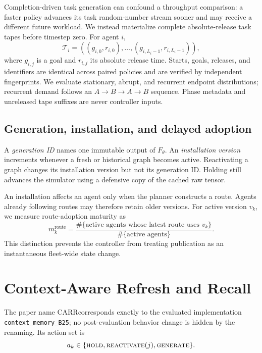 \documentclass[sigconf,anonymous,review]{acmart}
\newcommand{\carr}{\textsc{CARR}}
\begin{document}
Completion-driven task generation can confound a throughput comparison: a
faster policy advances its task random-number stream sooner and may receive a
different future workload. We instead materialize complete absolute-release
task tapes before timestep zero. For agent $i$,
\begin{equation}
  \mathcal{T}_i=((g_{i,0},r_{i,0}),\ldots,(g_{i,L_i-1},r_{i,L_i-1})),
\end{equation}
where $g_{i,j}$ is a goal and $r_{i,j}$ its absolute release time. Starts,
goals, releases, and identifiers are identical across paired policies and are
verified by independent fingerprints. We evaluate stationary, abrupt, and
recurrent endpoint distributions; recurrent demand follows an
$A\!\rightarrow\!B\!\rightarrow\!A\!\rightarrow\!B$ sequence. Phase metadata
and unreleased tape suffixes are never controller inputs.

\subsection{Generation, installation, and delayed adoption}

A \emph{generation ID} names one immutable output of $F_\theta$. An
\emph{installation version} increments whenever a fresh or historical graph
becomes active. Reactivating a graph changes its installation version but not
its generation ID. Holding still advances the simulator using a defensive copy
of the cached raw tensor.

An installation affects an agent only when the planner constructs a route.
Agents already following routes may therefore retain older versions. For
active version $v_k$, we measure route-adoption maturity as
\begin{equation}
 m_k^{\mathrm{route}}=
 \frac{\#\{\text{active agents whose latest route uses }v_k\}}
      {\#\{\text{active agents}\}}.
\end{equation}
This distinction prevents the controller from treating publication as an
instantaneous fleet-wide state change.

\section{Context-Aware Refresh and Recall}

The paper name \carr corresponds exactly to the evaluated implementation
\texttt{context\_memory\_B25}; no post-evaluation behavior change is hidden by
the renaming. Its action set is
\begin{equation}
 a_k\in\{\textsc{hold},\textsc{reactivate}(j),\textsc{generate}\}.
\end{equation}
\end{document}
